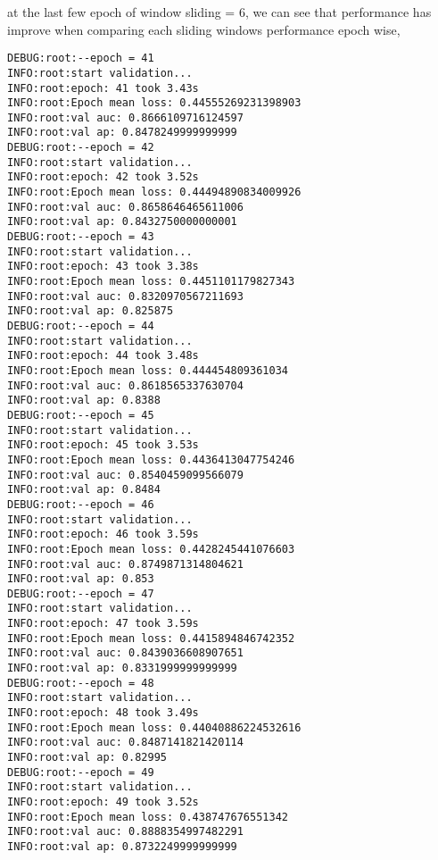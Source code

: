 \documentclass[11pt]{article}
\begin{document}
at the last few epoch of window sliding = 6, we can see that performance has improve when comparing each sliding windows performance epoch wise,
\begin{verbatim}
DEBUG:root:--epoch = 41
INFO:root:start validation...
INFO:root:epoch: 41 took 3.43s
INFO:root:Epoch mean loss: 0.44555269231398903
INFO:root:val auc: 0.8666109716124597
INFO:root:val ap: 0.8478249999999999
DEBUG:root:--epoch = 42
INFO:root:start validation...
INFO:root:epoch: 42 took 3.52s
INFO:root:Epoch mean loss: 0.44494890834009926
INFO:root:val auc: 0.8658646465611006
INFO:root:val ap: 0.8432750000000001
DEBUG:root:--epoch = 43
INFO:root:start validation...
INFO:root:epoch: 43 took 3.38s
INFO:root:Epoch mean loss: 0.4451101179827343
INFO:root:val auc: 0.8320970567211693
INFO:root:val ap: 0.825875
DEBUG:root:--epoch = 44
INFO:root:start validation...
INFO:root:epoch: 44 took 3.48s
INFO:root:Epoch mean loss: 0.444454809361034
INFO:root:val auc: 0.8618565337630704
INFO:root:val ap: 0.8388
DEBUG:root:--epoch = 45
INFO:root:start validation...
INFO:root:epoch: 45 took 3.53s
INFO:root:Epoch mean loss: 0.4436413047754246
INFO:root:val auc: 0.8540459099566079
INFO:root:val ap: 0.8484
DEBUG:root:--epoch = 46
INFO:root:start validation...
INFO:root:epoch: 46 took 3.59s
INFO:root:Epoch mean loss: 0.4428245441076603
INFO:root:val auc: 0.8749871314804621
INFO:root:val ap: 0.853
DEBUG:root:--epoch = 47
INFO:root:start validation...
INFO:root:epoch: 47 took 3.59s
INFO:root:Epoch mean loss: 0.4415894846742352
INFO:root:val auc: 0.8439036608907651
INFO:root:val ap: 0.8331999999999999
DEBUG:root:--epoch = 48
INFO:root:start validation...
INFO:root:epoch: 48 took 3.49s
INFO:root:Epoch mean loss: 0.44040886224532616
INFO:root:val auc: 0.8487141821420114
INFO:root:val ap: 0.82995
DEBUG:root:--epoch = 49
INFO:root:start validation...
INFO:root:epoch: 49 took 3.52s
INFO:root:Epoch mean loss: 0.438747676551342
INFO:root:val auc: 0.8888354997482291
INFO:root:val ap: 0.8732249999999999
\end{verbatim}
\end{document}
